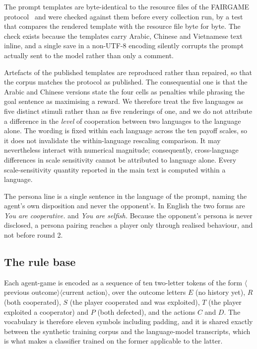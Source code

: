 \documentclass[11pt,a4paper]{article}
\begin{document}
The prompt templates are byte-identical to the resource files of the FAIRGAME protocol~\cite{buscemi2025fairgame} and were checked against them before every collection run, by a test that compares the rendered template with the resource file byte for byte. The check exists because the templates carry Arabic, Chinese and Vietnamese text inline, and a single save in a non-UTF-8 encoding silently corrupts the prompt actually sent to the model rather than only a comment.

Artefacts of the published templates are reproduced rather than repaired, so that the corpus matches the protocol as published. The consequential one is that the Arabic and Chinese versions state the four cells as penalties while phrasing the goal sentence as maximising a reward. We therefore treat the five languages as five distinct stimuli rather than as five renderings of one, and we do not attribute a difference in the \emph{level} of cooperation between two languages to the language alone. The wording is fixed within each language across the ten payoff scales, so it does not invalidate the within-language rescaling comparison. It may nevertheless interact with numerical magnitude; consequently, cross-language differences in scale sensitivity cannot be attributed to language alone. Every scale-sensitivity quantity reported in the main text is computed within a language.

The persona line is a single sentence in the language of the prompt, naming the agent's own disposition and never the opponent's. In English the two forms are \emph{You are cooperative.} and \emph{You are selfish.} Because the opponent's persona is never disclosed, a persona pairing reaches a player only through realised behaviour, and not before round 2.

\subsection{The rule base}\label{appendix:rule_based}

Each agent-game is encoded as a sequence of ten two-letter tokens of the form $\langle$previous outcome$\rangle\langle$current action$\rangle$, over the outcome letters $E$ (no history yet), $R$ (both cooperated), $S$ (the player cooperated and was exploited), $T$ (the player exploited a cooperator) and $P$ (both defected), and the actions $C$ and $D$. The vocabulary is therefore eleven symbols including padding, and it is shared exactly between the synthetic training corpus and the language-model transcripts, which is what makes a classifier trained on the former applicable to the latter.
\end{document}
